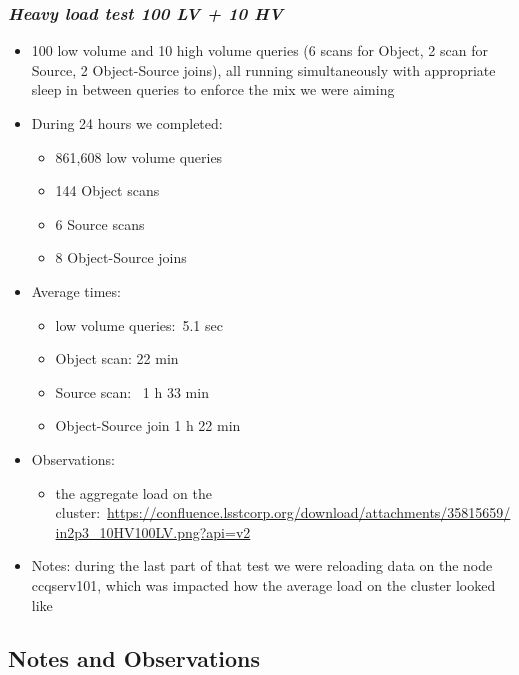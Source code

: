 \subsubsection{\texorpdfstring{\textbf{\emph{Heavy load test 100 LV + 10
HV}}}{Heavy load test 100 LV + 10 HV}}\label{heavy-load-test-100-lv-10-hv}

\begin{itemize}
\item
  100 low volume and 10 high volume queries (6 scans for Object, 2 scan
  for Source, 2 Object-Source joins), all running simultaneously with
  appropriate sleep in between queries to enforce the mix we were aiming
\item
  During 24 hours we completed:

  \begin{itemize}
  \item
    861,608 low volume queries
  \item
    144 Object scans
  \item
    6 Source scans
  \item
    8 Object-Source joins
  \end{itemize}
\item
  Average times:

  \begin{itemize}
  \item
    low volume queries:~5.1 sec
  \item
    Object scan: 22 min
  \item
    Source scan: ~1 h 33 min
  \item
    Object-Source join 1 h 22 min
  \end{itemize}
\item
  Observations:

  \begin{itemize}
  \item
    the aggregate load on the
    cluster:~\url{https://confluence.lsstcorp.org/download/attachments/35815659/in2p3_10HV100LV.png?api=v2}
  \end{itemize}
\item
  Notes: during the last part of that test we were reloading data on the
  node ccqserv101, which was impacted how the average load on the
  cluster looked like
\end{itemize}

\subsection{Notes and Observations}\label{notes-and-observations}

